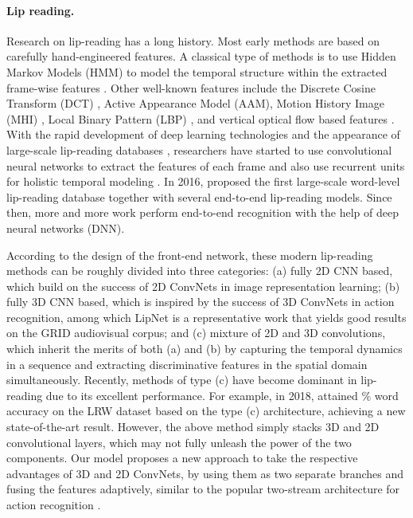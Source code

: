 \documentclass{bmvc2k}
\begin{document}
\paragraph{Lip reading.}Research on lip-reading has a long history. Most early methods are based on carefully hand-engineered features. A classical type of methods is to use Hidden Markov Models (HMM) to model the temporal structure within the extracted frame-wise features \cite{chiou1997lipreading,potamianos2003recent,chandrasekaran2009natural}. Other well-known features include the Discrete Cosine Transform (DCT) \cite{potamianos1998image}, Active Appearance Model (AAM), Motion History Image (MHI) \cite{duchnowski1995toward}, Local Binary Pattern (LBP) \cite{zhao2009lipreading}, and vertical optical flow based features \cite{shaikh2010lip}. With the rapid development of deep learning technologies and the appearance of large-scale lip-reading databases \cite{chung2016lip,1chung2017lip,yang2018lrw}, researchers have started to use convolutional neural networks to extract the features of each frame and also use recurrent units for holistic temporal modeling \cite{noda2015audio,thangthai2015improving,almajai2016improved}. In 2016, \cite{chung2016lip} proposed the first large-scale word-level lip-reading database together with several end-to-end lip-reading models. Since then, more and more work perform end-to-end recognition with the help of deep neural networks (DNN).

According to the design of the front-end network, these modern lip-reading methods can be roughly divided into three categories: (a) fully 2D CNN based, which build on the success of 2D ConvNets in image representation learning;  
(b) fully 3D CNN based, which is inspired by the success of 3D ConvNets in action recognition, among which LipNet\cite{assael2016lipnet} is a representative work that yields good results on the GRID audiovisual corpus; and (c) mixture of 2D and 3D convolutions, which inherit the merits of both (a) and (b) by capturing the temporal dynamics in a sequence and extracting discriminative features in the spatial domain simultaneously. Recently, methods of type (c) have become dominant in lip-reading due to its excellent performance. For example, in 2018, \cite{1petridis2018end} attained \% word accuracy on the LRW dataset based on the type (c) architecture, achieving a new state-of-the-art result. However, the above method simply stacks 3D and 2D convolutional layers, which may not fully unleash the power of the two components. Our model proposes a new approach to take the respective advantages of 3D and 2D ConvNets, by using them as two separate branches and fusing the features adaptively, similar to the popular two-stream architecture for action recognition \cite{simonyan2014two}.
\vspace{-1.5em}
\end{document}
